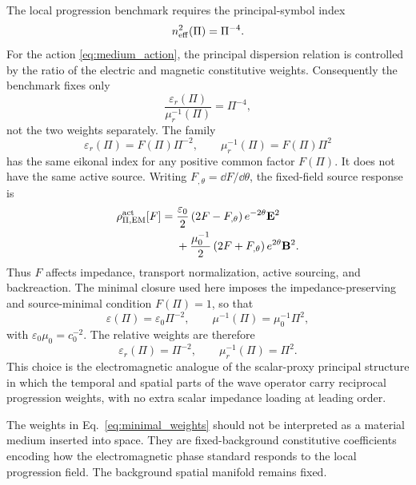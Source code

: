 \documentclass[12pt]{article}
\begin{document}
The local progression benchmark requires the principal-symbol index
\begin{equation}
 n_{\rm eff}^2(\Pi)=\Pi^{-4}.
\label{eq:n_squared_target}
\end{equation}
For the action \eqref{eq:medium_action}, the principal dispersion relation is controlled by the ratio of the electric and magnetic constitutive weights.  Consequently the benchmark fixes only
\begin{equation}
 \frac{\varepsilon_r(\Pi)}{\mu_r^{-1}(\Pi)}=\Pi^{-4},
\label{eq:ratio_fixed_only}
\end{equation}
not the two weights separately.  The family
\begin{equation}
 \varepsilon_r(\Pi)=F(\Pi)\Pi^{-2},
 \qquad
 \mu_r^{-1}(\Pi)=F(\Pi)\Pi^2
\label{eq:F_family}
\end{equation}
has the same eikonal index for any positive common factor $F(\Pi)$.  It does not have the same active source.  Writing \(F_{,\theta}=\dd F/\dd\theta\), the fixed-field source response is
\begin{equation}
\begin{aligned}
 \rho_{\Pi,{\rm EM}}^{\rm act}[F]
 ={}&\frac{\varepsilon_0}{2}
   \left(2F-F_{,\theta}\right)e^{-2\theta}\mathbf E^2\\
 &+\frac{\mu_0^{-1}}{2}
   \left(2F+F_{,\theta}\right)e^{2\theta}\mathbf B^2 .
 \label{eq:general-F-source}
\end{aligned}
\end{equation}
Thus \(F\) affects impedance, transport normalization, active sourcing, and backreaction.  The minimal closure used here imposes the impedance-preserving and source-minimal condition \(F(\Pi)=1\), so that
\begin{equation}
 \varepsilon(\Pi)=\varepsilon_0\Pi^{-2},
 \qquad
 \mu^{-1}(\Pi)=\mu_0^{-1}\Pi^2,
\label{eq:minimal_weights}
\end{equation}
with $\varepsilon_0\mu_0=c_0^{-2}$.  The relative weights are therefore
\begin{equation}
 \varepsilon_r(\Pi)=\Pi^{-2},
 \qquad
 \mu_r^{-1}(\Pi)=\Pi^2.
\label{eq:relative_weights}
\end{equation}
This choice is the electromagnetic analogue of the scalar-proxy principal structure in which the temporal and spatial parts of the wave operator carry reciprocal progression weights, with no extra scalar impedance loading at leading order.

\begin{remark}
The weights in Eq.~\eqref{eq:minimal_weights} should not be interpreted as a material medium inserted into space.  They are fixed-background constitutive coefficients encoding how the electromagnetic phase standard responds to the local progression field.  The background spatial manifold remains fixed.
\end{remark}
\end{document}
